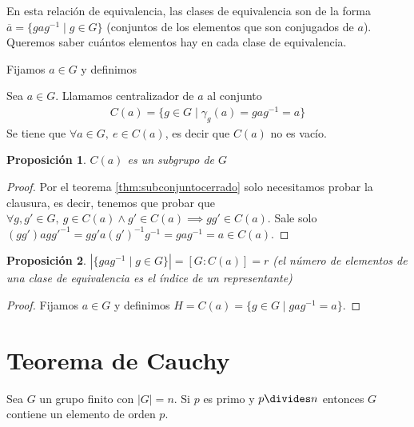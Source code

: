 \documentclass{book}
\newtheorem{pro}{Proposición}
\theoremstyle{definition}
\theoremstyle{remark}
\newcommand{\inv}[1]{#1^{-1}}
\begin{document}
En esta relación de equivalencia, las clases de equivalencia son de la forma $\overline{a} = \{ga\inv{g} \mid g \in G\}$ (conjuntos de los elementos que son conjugados de $a$). Queremos saber cuántos elementos hay en cada clase de equivalencia.

Fijamos $a \in G$ y definimos

\begin{dfn}
	\label{dfn:centralizador}
	Sea $a \in G$. Llamamos centralizador de $a$ al conjunto
	\begin{align}
	C(a) = \{g \in G \mid \gamma_g(a) = g a \inv{g} = a\}
	\end{align}
	Se tiene que $\forall a \in G,\ e \in C(a)$, es decir que $C(a)$ no es vacío.
\end{dfn}

\begin{pro}
	$C(a)$ es un subgrupo de $G$
\end{pro}

\begin{proof}
	Por el teorema \ref{thm:subconjuntocerrado} solo necesitamos probar la clausura, es decir, tenemos que probar que $\forall g,g' \in G,\ g \in C(a) \land g' \in C(a) \implies gg' \in C(a)$. Sale solo $(gg')a\inv{gg'} = gg'a\inv{(g')}\inv{g} = ga\inv{g} = a \in C(a)$.
\end{proof}

\begin{pro}
	\label{pro:cardinalcajas}
	$|\{ga\inv{g} \mid g \in G\}| = [G:C(a)] = r$ (el número de elementos de una clase de equivalencia es el índice de un representante)
\end{pro}

\begin{proof}
	Fijamos $a \in G$ y definimos $H = C(a) = \{g \in G \mid ga\inv{g} = a\}$.
\end{proof}



\section{Teorema de Cauchy}

\begin{thm}[de Cauchy]
	Sea $G$ un grupo finito con $|G| = n$. Si $p$ es primo y $p\divides n$ entonces $G$ contiene un elemento de orden $p$.
\end{thm}
\end{document}
